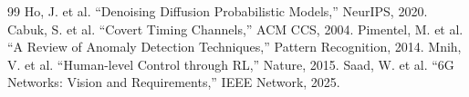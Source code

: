 \documentclass[sigconf]{acmart}
\begin{document}

\begin{thebibliography}{99}
 Ho, J. et al. ``Denoising Diffusion Probabilistic Models,'' NeurIPS, 2020.
 Cabuk, S. et al. ``Covert Timing Channels,'' ACM CCS, 2004.
 Pimentel, M. et al. ``A Review of Anomaly Detection Techniques,'' Pattern Recognition, 2014.
 Mnih, V. et al. ``Human-level Control through RL,'' Nature, 2015.
 Saad, W. et al. ``6G Networks: Vision and Requirements,'' IEEE Network, 2025.
\end{thebibliography}
\end{document}
